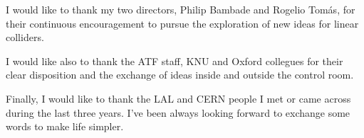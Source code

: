 \vfill
I would like to thank my two directors, Philip Bambade and Rogelio Tom\'as, for their continuous encouragement to pursue the exploration of new ideas for linear colliders.\par
I would like also to thank the ATF staff, KNU and Oxford collegues for their clear disposition and the exchange of ideas inside and outside the control room.\par
Finally, I would like to thank the LAL and CERN people I met or came across during the last three years. I've been always looking forward to exchange some words to make life simpler.\par

